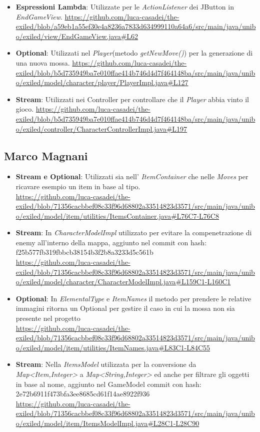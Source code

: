 \documentclass[a4paper,12pt]{report}
\begin{document}
\begin{itemize}
	\item \textbf{Espressioni Lambda}: Utilizzate per le \textit{ActionListener} dei JButton in \textit{EndGameView}.
	\url{https://github.com/luca-casadei/the-exiled/blob/a59eb1a55ef30e4a8236a7833d634999110a64a6/src/main/java/unibo/exiled/view/EndGameView.java#L62}
	\item \textbf{Optional}: Utilizzati nel \textit{Player}(metodo \textit{getNewMove()}) per la generazione di una nuova mossa.
	\url{https://github.com/luca-casadei/the-exiled/blob/b5d735949ba7e010ffae414b746d4d7f464148ba/src/main/java/unibo/exiled/model/character/player/PlayerImpl.java#L127}
	\item \textbf{Stream}: Utilizzati nei Controller per controllare che il \textit{Player} abbia vinto il gioco.
	\url{https://github.com/luca-casadei/the-exiled/blob/b5d735949ba7e010ffae414b746d4d7f464148ba/src/main/java/unibo/exiled/controller/CharacterControllerImpl.java#L197}
\end{itemize}

\subsection{Marco Magnani}
\begin{itemize}
	\item \textbf{Stream e Optional}: Utilizzati sia nell' \textit{ItemContainer} che nelle \textit{Moves} per ricavare esempio un item in base al tipo.\\ \url{https://github.com/luca-casadei/the-exiled/blob/71356cacbbef08c33f96d68802a33514823d3571/src/main/java/unibo/exiled/model/item/utilities/ItemsContainer.java#L76C7-L76C8}
	\item \textbf{Stream}: In \textit{CharacterModelImpl} utilizzato per evitare la compenetrazione di enemy all'interno della mappa, aggiunto nel commit con hash: f25b577fb319fbbcb38154b3f2b8a3233d5c561b\\
	\url{https://github.com/luca-casadei/the-exiled/blob/71356cacbbef08c33f96d68802a33514823d3571/src/main/java/unibo/exiled/model/character/CharacterModelImpl.java#L159C1-L160C1} 
	\item \textbf{Optional}: In \textit{ElementalType} e \textit{ItemNames} il metodo per prendere le relative immagini ritorna un Optional per gestire il caso in cui la mossa non sia presente nel progetto\\
	\url{https://github.com/luca-casadei/the-exiled/blob/71356cacbbef08c33f96d68802a33514823d3571/src/main/java/unibo/exiled/model/item/utilities/ItemNames.java#L83C1-L84C55}
	\item \textbf{Stream}: Nella \textit{ItemsModel} utilizzata per la conversione da \textit{Map\textless Item,Integer\textgreater} a \textit{Map\textless String,Integer\textgreater} ed anche per filtrare gli oggetti in base al nome, aggiunto nel GameModel commit con hash: 2e72b6911f473bfa3ee8685cd61f14ae8922f936\\
	\url{https://github.com/luca-casadei/the-exiled/blob/71356cacbbef08c33f96d68802a33514823d3571/src/main/java/unibo/exiled/model/item/ItemsModelImpl.java#L28C1-L28C90}
\end{itemize}
\end{document}

